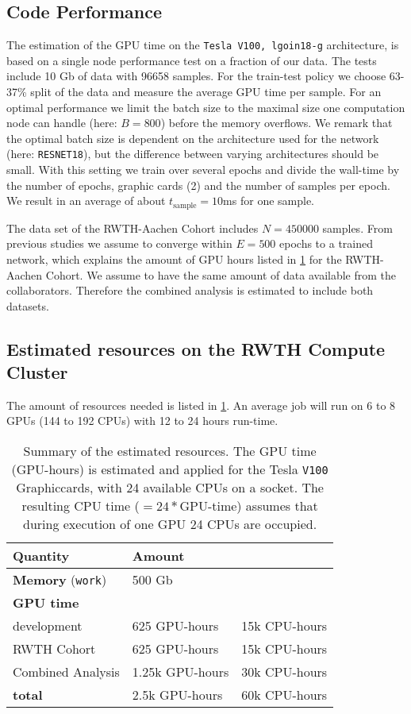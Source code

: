 \documentclass[12pt]{article}
\begin{document}
\subsection{Code Performance}

The estimation of the GPU time on the \texttt{Tesla V100, lgoin18-g} architecture,
is based on a single node performance test on a fraction of our data.
The tests include 10 Gb of data with 96658 samples. For the train-test policy
we choose 63-37\% split of the data and measure the average GPU time per sample.
For an optimal performance we limit the batch size to the maximal size one computation node can handle (here: $B=800$) before the memory overflows. We remark that the optimal batch size is dependent on the architecture used for the network (here: \texttt{RESNET18}),
but the difference between varying architectures should be small.
With this setting we train over several epochs and divide the wall-time by the number
of epochs, graphic cards (2) and the number of samples per epoch. We result in an average of about $t_\mathrm{sample}=10$ms for one sample.

The data set of the RWTH-Aachen Cohort includes $N=450000$ samples. From previous studies
we assume to converge within $E=500$ epochs to a trained network, which explains the amount of
GPU hours listed in \cref{tabl:resource} for the RWTH-Aachen Cohort. We assume to have the same amount of data available from the collaborators. Therefore the combined analysis
is estimated to include both datasets.

\subsection{Estimated resources on the RWTH Compute Cluster}

The amount of resources needed is listed in \cref{tabl:resource}.
An average job will run on 6 to 8 GPUs (144 to 192 CPUs) with 12 to 24 hours run-time.

\begin{table}
	\centering
	\begin{tabular}{l l l}
		\toprule
		Quantity & Amount &  \\
		\midrule
		\textbf{Memory} (\texttt{work}) & 500 Gb \\
		\hline
		\textbf{GPU time} \\
		development & 625 GPU-hours & 15k CPU-hours \\
		RWTH Cohort & 625 GPU-hours & 15k CPU-hours\\
		Combined Analysis & 1.25k GPU-hours & 30k CPU-hours \\
		\hline
		\hline
		\textbf{total} &  2.5k GPU-hours & 60k CPU-hours\\
		\bottomrule
	\end{tabular}
	\caption{Summary of the estimated resources. The GPU time (GPU-hours) is estimated and applied for the Tesla \texttt{V100} Graphiccards, with 24 available CPUs on a socket. The resulting CPU time ($=24*$GPU-time) assumes that during execution of one GPU 24 CPUs are occupied.}
	\label{tabl:resource}
\end{table}
\end{document}
